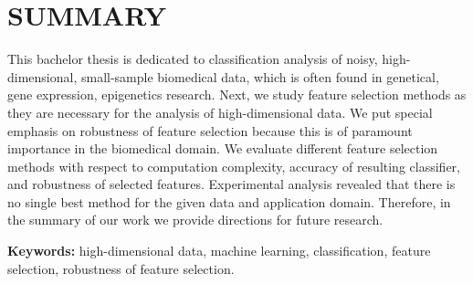 \section*{SUMMARY}
\label{summary}

This bachelor thesis is dedicated to classification analysis of noisy, high-dimensional, small-sample biomedical data, which is often found in genetical, gene expression, epigenetics research. Next, we study feature selection methods as they are necessary for the analysis of high-dimensional data. We put special emphasis on robustness of feature selection because this is of paramount importance in the biomedical domain. We evaluate different feature selection methods with respect to computation complexity, accuracy of resulting classifier, and robustness of selected features. Experimental analysis revealed that there is no single best method for the given data and application domain. Therefore, in the summary of our work we provide directions for future research.

\textbf{Keywords:} high-dimensional data, machine learning, classification, feature selection, robustness of feature selection.
